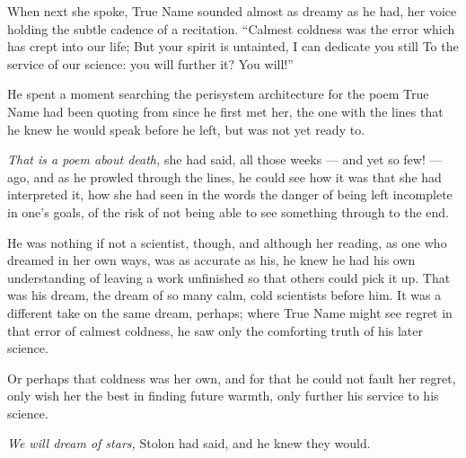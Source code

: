 When next she spoke, True Name sounded almost as dreamy as he had, her voice holding the subtle cadence of a recitation. ``Calmest coldness was the error which has crept into our life; But your spirit is untainted, I can dedicate you still To the service of our science: you will further it? You will!''

He spent a moment searching the perisystem architecture for the poem True Name had been quoting from since he first met her, the one with the lines that he knew he would speak before he left, but was not yet ready to.

\emph{That is a poem about death,} she had said, all those weeks — and yet so few! — ago, and as he prowled through the lines, he could see how it was that she had interpreted it, how she had seen in the words the danger of being left incomplete in one's goals, of the risk of not being able to see something through to the end.

He was nothing if not a scientist, though, and although her reading, as one who dreamed in her own ways, was as accurate as his, he knew he had his own understanding of leaving a work unfinished so that others could pick it up. That was his dream, the dream of so many calm, cold scientists before him. It was a different take on the same dream, perhaps; where True Name might see regret in that error of calmest coldness, he saw only the comforting truth of his later science.

Or perhaps that coldness was her own, and for that he could not fault her regret, only wish her the best in finding future warmth, only further his service to his science.

\emph{We will dream of stars,} Stolon had said, and he knew they would.
